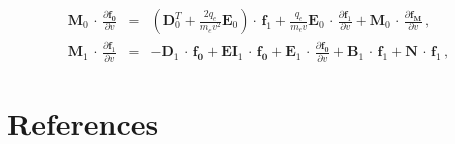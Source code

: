 \documentclass[review]{elsarticle}
\newcommand{\pdv}[2]{\frac{\partial{#1}}{\partial{#2}}}
\newcommand{\vect}[1]{\boldsymbol{#1}}
\newcommand{\matr}[1]{\mathbf{#1}}
\newcommand{\vmag}{v}
\newcommand{\qe}{q_e}
\newcommand{\me}{m_e}
\newcommand{\fM}{f_M}
\newcommand{\fzero}{f_0}
\newcommand{\fone}{\vect{f}_1}
\begin{document}
\begin{eqnarray}
  \matr{M}_0\, \cdot\, \pdv{\vect{\fzero}}{\vmag} &=& 
  \left(\matr{D}_0^T + \frac{2\qe}{\me\vmag^2}\matr{E}_0\right) \cdot\, \fone + 
  \frac{\qe}{\me\vmag}\matr{E}_0\, \cdot\, \pdv{\fone}{\vmag}
  + \matr{M}_0\, \cdot\, \pdv{\vect{\fM}}{\vmag}\, , 
  \label{eq:MM1hosf0}\\
  \matr{M}_1\, \cdot\, \pdv{\fone}{\vmag} &=& 
  - \matr{D}_1\, \cdot\, \vect{\fzero} + \matr{EI}_1\, \cdot\, \vect{\fzero}
  + \matr{E}_1\, \cdot\, \pdv{\vect{\fzero}}{\vmag} 
  + \matr{B}_1\, \cdot\, \fone + \matr{N}\, \cdot\, \fone\, ,
  \label{eq:MM1hosf1}
\end{eqnarray}
\cite{Dobrev_Kolev_Rieben-High-order_curvilinear_finite_element_methods_for_Lagrangian_hydrodynamics}

\section*{References}



\end{document}
